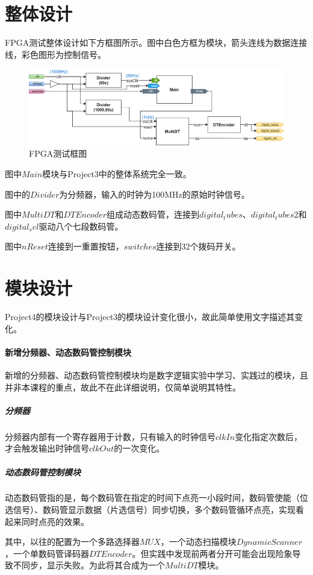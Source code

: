 \documentclass[main.tex]{subfiles}
\begin{document}
\section{整体设计}
FPGA测试整体设计如下方框图所示。图中白色方框为模块，箭头连线为数据连接线，彩色图形为控制信号。
\begin{figure}[h]
\centering
\includegraphics[width=\textwidth]{images/PCOCD-P4-pratical-block.png}
\caption{FPGA测试框图}
\end{figure}

图中$Main$模块与Project3中的整体系统完全一致。

图中的$Divider$为分频器，输入的时钟为100MHz的原始时钟信号。

图中$MultiDT$和$DTEncoder$组成动态数码管，连接到$digital_tubes$、$digital_tubes2$和$digital_sel$驱动八个七段数码管。

图中$nReset$连接到一重置按钮，$switches$连接到32个拨码开关。

\section{模块设计}

Project4的模块设计与Project3的模块设计变化很小，故此简单使用文字描述其变化。

\paragraph{新增分频器、动态数码管控制模块}
新增的分频器、动态数码管控制模块均是数字逻辑实验中学习、实践过的模块，且并非本课程的重点，故此不在此详细说明，仅简单说明其特性。

\subparagraph{分频器}
分频器内部有一个寄存器用于计数，只有输入的时钟信号$clkIn$变化指定次数后，才会触发输出时钟信号$clkOut$的一次变化。

\subparagraph{动态数码管控制模块}
动态数码管指的是，每个数码管在指定的时间下点亮一小段时间，数码管使能（位选信号）、数码管显示数据（片选信号）同步切换，多个数码管循环点亮，实现看起来同时点亮的效果。

其中，以往的配置为一个多路选择器$MUX$，一个动态扫描模块$DynamicScanner$，一个单数码管译码器$DTEncoder$。但实践中发现前两者分开可能会出现险象导致不同步，显示失败。为此将其合成为一个$MultiDT$模块。
\end{document}
